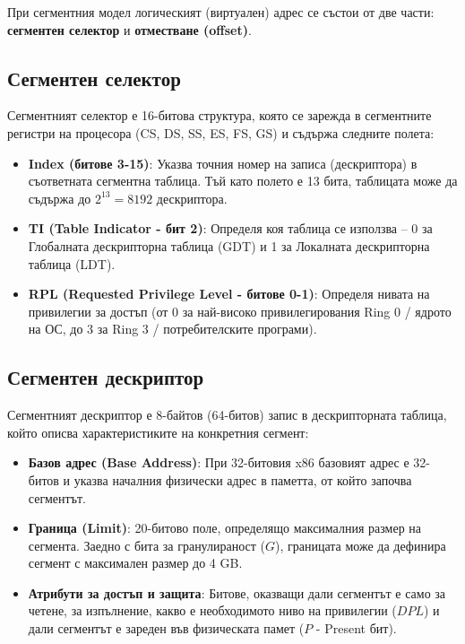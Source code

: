\documentclass{scrartcl}
\begin{document}
\begin{FlushLeft}
При сегментния модел логическият (виртуален) адрес се състои от две части: \textbf{сегментен селектор} и \textbf{отместване (offset)}.

\subsection{Сегментен селектор}
Сегментният селектор е 16-битова структура, която се зарежда в сегментните регистри на процесора (CS, DS, SS, ES, FS, GS) и съдържа следните полета:
\begin{itemize}
    \item \textbf{Index (битове 3-15)}: Указва точния номер на записа (дескриптора) в съответната сегментна таблица. Тъй като полето е 13 бита, таблицата може да съдържа до $2^{13} = 8192$ дескриптора.
    \item \textbf{TI (Table Indicator - бит 2)}: Определя коя таблица се използва – 0 за Глобалната дескрипторна таблица (GDT) и 1 за Локалната дескрипторна таблица (LDT).
    \item \textbf{RPL (Requested Privilege Level - битове 0-1)}: Определя нивата на привилегии за достъп (от 0 за най-високо привилегирования Ring 0 / ядрото на ОС, до 3 за Ring 3 / потребителските програми).
\end{itemize}

\subsection{Сегментен дескриптор}
Сегментният дескриптор е 8-байтов (64-битов) запис в дескрипторната таблица, който описва характеристиките на конкретния сегмент:
\begin{itemize}
    \item \textbf{Базов адрес (Base Address)}: При 32-битовия x86 базовият адрес е 32-битов и указва началния физически адрес в паметта, от който започва сегментът.
    \item \textbf{Граница (Limit)}: 20-битово поле, определящо максималния размер на сегмента. Заедно с бита за гранулираност ($G$), границата може да дефинира сегмент с максимален размер до 4 GB.
    \item \textbf{Атрибути за достъп и защита}: Битове, оказващи дали сегментът е само за четене, за изпълнение, какво е необходимото ниво на привилегии ($DPL$) и дали сегментът е зареден във физическата памет ($P$ - Present бит).
\end{itemize}


\end{FlushLeft}
\end{document}
